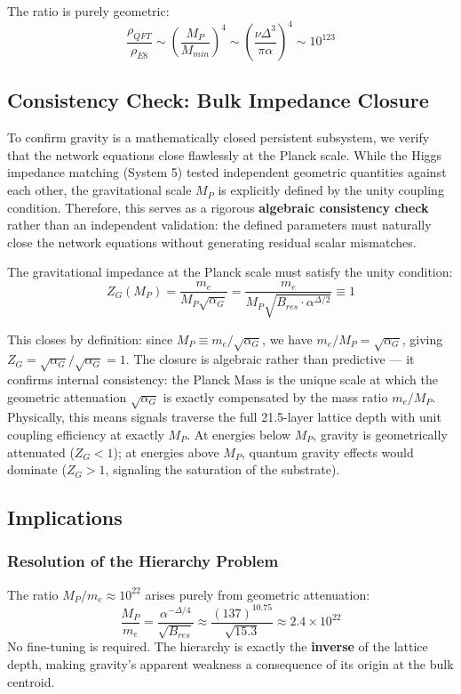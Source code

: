 The ratio is purely geometric:
\begin{equation}
    \frac{\rho_{QFT}}{\rho_{E8}} \sim \left(\frac{M_P}{M_{min}}\right)^4 
    \sim \left(\frac{\nu\Delta^3}{\pi\alpha}\right)^4 
    \sim 10^{123}
\end{equation}

\subsection{Consistency Check: Bulk Impedance Closure}
To confirm gravity is a mathematically closed persistent subsystem, we verify that the network equations close flawlessly at the Planck scale. While the Higgs impedance matching (System 5) tested independent geometric quantities against each other, the gravitational scale $M_P$ is explicitly defined by the unity coupling condition. Therefore, this serves as a rigorous \textbf{algebraic consistency check} rather than an independent validation: the defined parameters must naturally close the network equations without generating residual scalar mismatches.

The gravitational impedance at the Planck scale must satisfy the unity condition:
\begin{equation}
Z_G(M_P) = \frac{m_e}{M_P \sqrt{\alpha_G}} = \frac{m_e}{M_P \sqrt{B_{res} \cdot \alpha^{\Delta/2}}} \equiv 1
\end{equation}

This closes by definition: since $M_P \equiv m_e / \sqrt{\alpha_G}$, we have $m_e/M_P = \sqrt{\alpha_G}$, giving $Z_G = \sqrt{\alpha_G}/\sqrt{\alpha_G} = 1$. The closure is algebraic rather than predictive — it confirms internal consistency: the Planck Mass is the unique scale at which the geometric attenuation $\sqrt{\alpha_G}$ is exactly compensated by the mass ratio $m_e/M_P$. Physically, this means signals traverse the full 21.5-layer lattice depth with unit coupling efficiency at exactly $M_P$. At energies below $M_P$, gravity is geometrically attenuated ($Z_G < 1$); at energies above $M_P$, quantum gravity effects would dominate ($Z_G > 1$, signaling the saturation of the substrate).

\subsection{Implications}

\subsubsection{Resolution of the Hierarchy Problem}
The ratio $M_P/m_e \approx 10^{22}$ arises purely from geometric attenuation:
\begin{equation}
\frac{M_P}{m_e} = \frac{\alpha^{-\Delta/4}}{\sqrt{B_{res}}} \approx \frac{(137)^{10.75}}{\sqrt{15.3}} \approx 2.4 \times 10^{22}
\end{equation}
No fine-tuning is required. The hierarchy is exactly the \textbf{inverse} of the lattice depth, making gravity's apparent weakness a consequence of its origin at the bulk centroid.


